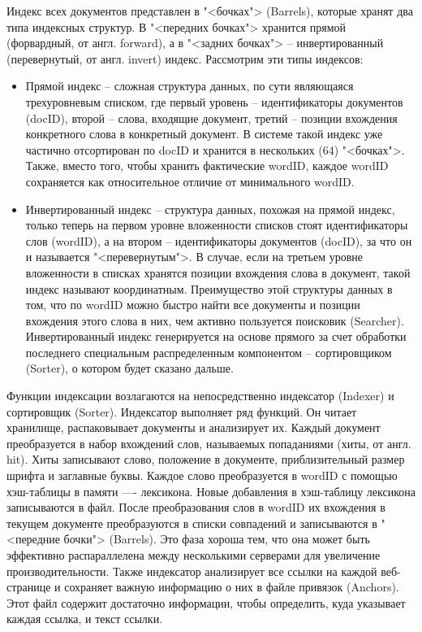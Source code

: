 Индекс всех документов представлен в "<бочках"> (Barrels), которые хранят два типа индексных структур. В "<передних бочках"> хранится прямой (форвардный, от англ. forward), а в "<задних бочках"> -- инвертированный (перевернутый, от англ. invert) индекс. Рассмотрим эти типы индексов:
\begin{itemize}
\item Прямой индекс -- сложная структура данных, по сути являющаяся трехуровневым списком, где первый уровень -- идентификаторы документов (docID), второй -- слова, входящие документ, третий -- позиции вхождения конкретного слова в конкретный документ.
В системе такой индекс уже частично отсортирован по docID и хранится в нескольких (64) "<бочках">. Также, вместо того, чтобы хранить фактические wordID, каждое wordID сохраняется как относительное отличие от минимального wordID.
\item Инвертированный индекс -- структура данных, похожая на прямой индекс, только теперь на первом уровне вложенности списков стоят идентификаторы слов (wordID), а на втором -- идентификаторы документов (docID), за что он и называется "<перевернутым">. В случае, если на третьем уровне вложенности в списках хранятся позиции вхождения слова в документ, такой индекс называют координатным. Преимущество этой структуры данных в том, что по wordID можно быстро найти все документы и позиции вхождения этого слова в них, чем активно пользуется поисковик (Searcher).
Инвертированный индекс генерируется на основе прямого за счет обработки последнего специальным распределенным компонентом -- сортировщиком (Sorter), о котором будет сказано дальше.
\end{itemize}

Функции индексации возлагаются на непосредственно индексатор (Indexer) и сортировщик (Sorter). Индексатор выполняет ряд функций. Он читает хранилище, распаковывает документы и анализирует их. Каждый документ преобразуется в набор вхождений слов, называемых попаданиями (хиты, от англ. hit). Хиты записывают слово, положение в документе, приблизительный размер шрифта и заглавные буквы. Каждое слово преобразуется в wordID с помощью хэш-таблицы в памяти —- лексикона. Новые добавления в хэш-таблицу лексикона записываются в файл. После преобразования слов в wordID их вхождения в текущем документе преобразуются в списки совпадений и записываются в "<передние бочки"> (Barrels). Это фаза хороша тем, что она может быть эффективно распараллелена между несколькими серверами для увеличение производительности. Также индексатор анализирует все ссылки на каждой веб-странице и сохраняет важную информацию о них в файле привязок (Anchors). Этот файл содержит достаточно информации, чтобы определить, куда указывает каждая ссылка, и текст ссылки. 

